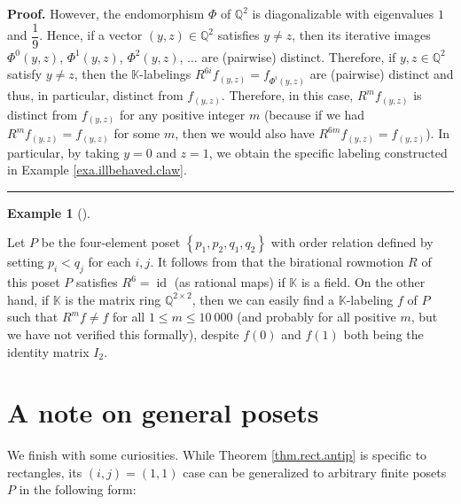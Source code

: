 \documentclass[numbers=enddot,12pt,final,onecolumn,notitlepage]{scrartcl}%
\theoremstyle{definition}
\newtheorem{exam}[theo]{Example}
\newenvironment{example}[1][]
{\begin{exam}[#1]\begin{leftbar}}
{\end{leftbar}\end{exam}}
\newenvironment{verlong}{}{}
\newenvironment{proof}[1][Proof]{\noindent\textbf{#1.} }{\ \rule{0.5em}{0.5em}}
\begin{document}
\begin{verlong}
\begin{proof}
However, the endomorphism $\Phi$ of $\mathbb{Q}^{2}$ is diagonalizable with
eigenvalues $1$ and $\dfrac{1}{9}$. Hence, if a vector $\left(  y,z\right)
\in\mathbb{Q}^{2}$ satisfies $y\neq z$, then its iterative images $\Phi
^{0}\left(  y,z\right)  $, $\Phi^{1}\left(  y,z\right)  $, $\Phi^{2}\left(
y,z\right)  $, $\ldots$ are (pairwise) distinct. Therefore, if $y,z\in
\mathbb{Q}^{2}$ satisfy $y\neq z$, then the $\mathbb{K}$-labelings
$R^{6i}f_{\left(  y,z\right)  }=f_{\Phi^{i}\left(  y,z\right)  }$ are
(pairwise) distinct and thus, in particular, distinct from $f_{\left(
y,z\right)  }$. Therefore, in this case, $R^{m}f_{\left(  y,z\right)  }$ is
distinct from $f_{\left(  y,z\right)  }$ for any positive integer $m$ (because
if we had $R^{m}f_{\left(  y,z\right)  }=f_{\left(  y,z\right)  }$ for some
$m$, then we would also have $R^{6m}f_{\left(  y,z\right)  }=f_{\left(
y,z\right)  }$). In particular, by taking $y=0$ and $z=1$, we obtain the
specific labeling constructed in Example \ref{exa.illbehaved.claw}.
\end{proof}
\end{verlong}

\begin{example}
Let $P$ be the four-element poset $\left\{  p_{1},p_{2},q_{1},q_{2}\right\}  $
with order relation defined by setting $p_{i}<q_{j}$ for each $i,j$. It
follows from \cite[Proposition 74 \textbf{(b)} and Proposition 61]{bir-row-1}
that the birational rowmotion $R$ of this poset $P$ satisfies $R^{6}%
=\operatorname*{id}$ (as rational maps) if $\mathbb{K}$ is a field. On the
other hand, if $\mathbb{K}$ is the matrix ring $\mathbb{Q}^{2\times2}$, then
we can easily find a $\mathbb{K}$-labeling $f$ of $P$ such that $R^{m}f\neq f$
for all $1\leq m\leq10\ 000$ (and probably for all positive $m$, but we have
not verified this formally), despite $f\left(  0\right)  $ and $f\left(
1\right)  $ both being the identity matrix $I_{2}$.
\end{example}

\section{\label{sec.Rf11}A note on general posets}

We finish with some curiosities. While Theorem \ref{thm.rect.antip} is
specific to rectangles, its $\left(  i,j\right)  =\left(  1,1\right)  $ case
can be generalized to arbitrary finite posets $P$ in the following form:
\end{document}
